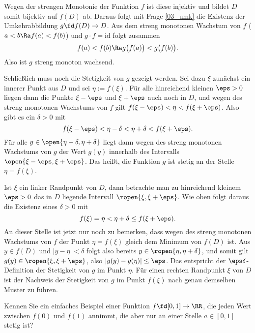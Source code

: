 \begin{antwort}
  Wegen der strengen Monotonie der Funktion $f$ ist diese injektiv und 
  bildet $D$ somit bijektiv auf $f(D)$ ab. 
  Daraus folgt mit Frage \ref{03_umk} die Existenz 
  der Umkehrabbildung $g\fd f(D) \to D$. 
  Aus dem streng monotonen Wachstum von $f$ 
  ($a<b \Ra f(a) <f(b)$) und $g\cdot f=\mathrm{id}$ folgt zusammen     
  \[
  f(a) < f(b) \Ra  g\big(f(a)\big) < g\big(f(b)\big).
  \]
  Also ist $g$ streng monoton wachsend.

  Schließlich muss noch die Stetigkeit von $g$ gezeigt werden. 
  Sei dazu $\xi$ zunächst ein innerer Punkt aus $D$ und sei $\eta:=f(\xi)$. 
  Für alle hinreichend kleinen $\eps >0$ liegen 
  dann die Punkte $\xi-\eps$ und $\xi+\eps$ auch noch in $D$, 
  und wegen des streng 
  monotonen Wachstums von $f$ gilt $f(\xi-\eps)<\eta<f(\xi+\eps)$. 
  Also gibt es ein $\delta>0$ mit 
  \[
  f(\xi-\eps) < \eta -\delta < \eta +\delta < f(\xi+\eps).
  \]
  Für alle $y\in \open{ \eta-\delta, \eta+\delta }$ liegt dann wegen 
  des streng monotonen Wachstums von $g$ der Wert $g(y)$ innerhalb des 
  Intervalls $\open{\xi-\eps, \xi+\eps}$. Das heißt, 
  die Funktion $g$ ist stetig an der Stelle $\eta=f(\xi)$.

  Ist $\xi$ ein linker Randpunkt von $D$, dann betrachte man 
  zu hinreichend kleinem $\eps>0$ das in $D$ liegende Intervall 
  $\ropen{\xi, \xi+\eps}$. Wie oben folgt daraus die Existenz 
  eines $\delta>0$ mit 
  \[
  f(\xi)=\eta < \eta +\delta \le f(\xi+\eps).
  \]
  An dieser Stelle ist jetzt nur noch zu bemerken, dass wegen des streng 
  monotonen Wachstums von $f$ der Punkt $\eta=f(\xi)$ gleich dem Minimum 
  von $f(D)$ ist. Aus $y\in f(D)$ und $|y-\eta|<\delta$ 
  folgt also bereits $y\in \ropen{\eta,\eta+\delta}$, und somit
  gilt $g(y) \in \ropen{\xi,\xi+\eps}$, also 
  $|g(y)-g(\eta)|\le \eps$. Das entspricht der 
  $\eps\delta$-Definition der Stetigkeit von $g$ im Punkt $\eta$. 
  Für einen rechten Randpunkt $\xi$ von $D$ ist der Nachweis der Stetigkeit 
  von $g$ im Punkt $f(\xi)$ nach genau demselben Muster zu führen.
  \AntEnd
\end{antwort}

\begin{frage}\label{03_unsb}
  Kennen Sie ein einfaches Beispiel einer Funktion $f\fd [0,1]\to \RR$, 
  die jeden Wert zwischen $f(0)$ und $f(1)$ annimmt, die aber nur an einer  
  Stelle $a\in [0,1]$ stetig ist?
\end{frage}

